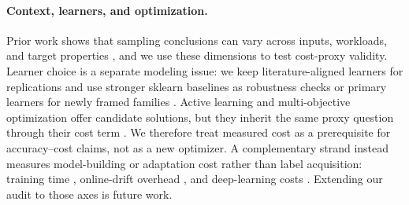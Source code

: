 \paragraph*{Context, learners, and optimization.}
Prior work shows that sampling conclusions can vary across inputs, workloads,
and target properties \cite{pereira2020,ye2026domland}, and we use these dimensions
to test cost-proxy validity. Learner choice is a separate modeling issue: we
keep literature-aligned learners for replications and use stronger sklearn
baselines as robustness checks or primary learners for newly framed families
\cite{breiman2001random,valov2015,amand2019,bao2018,sklearn_api}. Active
learning and multi-objective optimization offer candidate solutions, but they
inherit the same proxy question through their cost term
\cite{sarkar2015,siegmund2015FSE,li2020pareto}. We therefore treat measured
cost as a prerequisite for accuracy--cost claims, not as a new optimizer. A
complementary strand instead measures model-building or adaptation cost rather
than label acquisition: training time \cite{gong2022encoding}, online-drift
overhead \cite{xiang2026dhda}, and deep-learning costs \cite{gong2024dcpl}.
Extending our audit to those axes is future work.
